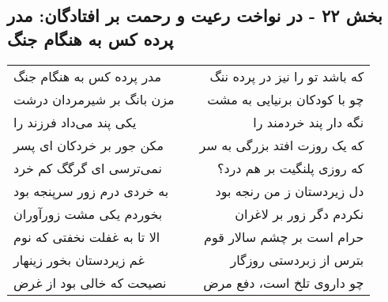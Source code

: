 \begin{center}
\section*{بخش ۲۲ - در نواخت رعیت و رحمت بر افتادگان: مدر پرده کس به هنگام جنگ}
\label{sec:022}
\begin{longtable}{l p{0.5cm} r}
مدر پرده کس به هنگام جنگ
&&
که باشد تو را نیز در پرده ننگ
\\
مزن بانگ بر شیرمردان درشت
&&
چو با کودکان برنیایی به مشت
\\
یکی پند می‌داد فرزند را
&&
نگه دار پند خردمند را
\\
مکن جور بر خردکان ای پسر
&&
که یک روزت افتد بزرگی به سر
\\
نمی‌ترسی ای گرگگ کم خرد
&&
که روزی پلنگیت بر هم درد؟
\\
به خردی درم زور سرپنجه بود
&&
دل زیردستان ز من رنجه بود
\\
بخوردم یکی مشت زورآوران
&&
نکردم دگر زور بر لاغران
\\
الا تا به غفلت نخفتی که نوم
&&
حرام است بر چشم سالار قوم
\\
غم زیردستان بخور زینهار
&&
بترس از زبردستی روزگار
\\
نصیحت که خالی بود از غرض
&&
چو داروی تلخ است، دفع مرض
\\
\end{longtable}
\end{center}
